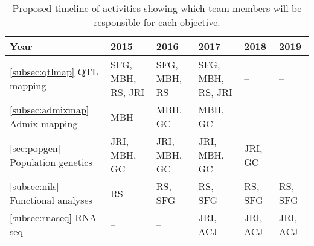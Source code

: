 \begin{table}[]
\label{tab:timeline}
\begin{center}
\begin{tabular}{p{3.5cm}p{2cm}p{2cm}p{2cm}p{2cm}p{2cm}}\\\toprule  
{\bf Year} & {\bf 2015} & {\bf 2016} & {\bf 2017} & {\bf 2018} & {\bf 2019} \\\midrule
\ref{subsec:qtlmap} \hspace{3cm} QTL mapping 			& SFG, MBH, RS, JRI 	& SFG, MBH, RS 	& SFG, MBH, RS, JRI 	& -- 			& -- \\\midrule
\ref{subsec:admixmap} \hspace{3cm} Admix mapping		& MBH 				& MBH, GC 		& MBH, GC 			& -- 			& -- \\\midrule
\ref{sec:popgen} \hspace{3cm} Population genetics		& JRI, MBH, GC 		& JRI, MBH, GC  	& JRI, MBH, GC		& JRI, GC 	& -- \\\midrule
\ref{subsec:nils} \hspace{2cm} Functional \mbox{analyses} 		& RS 				& RS, SFG		& RS, SFG 			& RS, SFG 	& RS, SFG  \\\midrule
\ref{subsec:rnaseq} \hspace{2cm} RNA-seq 				& --  					& --  				& JRI, ACJ  			& JRI, ACJ	& JRI, ACJ \\\bottomrule
\end{tabular}
\caption{Proposed timeline of activities showing which team members will be responsible for each objective.}\label{tab:timeline}

\end{center}
\end{table} 


